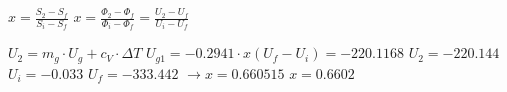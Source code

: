 \( x = \frac{S_2 - S_f}{S_i - S_f} \)  
\( x = \frac{\Phi_2 - \Phi_f}{\Phi_i - \Phi_f} = \frac{U_2 - U_f}{U_i - U_f} \)  

\( U_2 = m_{g} \cdot U_g + c_V \cdot \Delta T \)  
\( U_{g1} = -0.2941 \cdot x(U_f - U_i) = -220.1168 \)  
\( U_2 = -220.144 \)  
\( U_i = -0.033 \)  
\( U_f = -333.442 \)  
\( \rightarrow x = 0.660515 \)  
\( x = 0.6602 \)